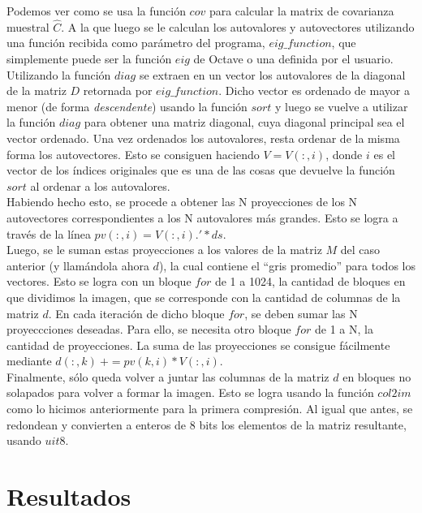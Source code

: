 \documentclass[twocolumn,a4paper,10pt]{article}
\begin{document}
Podemos ver como se usa la función $cov$ para calcular la matrix de covarianza muestral $\widehat{C}$. A la que luego se le calculan los autovalores y autovectores
utilizando una funci\'on recibida como par\'ametro del programa, $eig\_function$, que simplemente puede ser la funci\'on $eig$ de Octave o una definida por el usuario.
Utilizando la función $diag$ se extraen en un vector los autovalores de la diagonal de la matriz $D$ retornada por $eig\_function$. Dicho vector es ordenado de 
mayor a menor (de forma \textit{descendente}) usando la funci\'on $sort$ y luego se vuelve a utilizar la funci\'on $diag$ para obtener una matriz diagonal, cuya 
diagonal principal sea el vector ordenado. Una vez ordenados los autovalores, resta ordenar de la misma forma los autovectores. Esto se consiguen haciendo $V = V(:,i)$,
donde $i$ es el vector de los \'indices originales que es una de las cosas que devuelve la funci\'on $sort$ al ordenar a los autovalores.\\

Habiendo hecho esto, se procede a obtener las N proyecciones de los N autovectores correspondientes a los N autovalores más grandes. Esto se logra a través de la 
l\'inea $pv(:,i) = V(:,i).' * ds$. \\

Luego, se le suman estas proyecciones a los valores de la matriz $M$ del caso anterior (y llam\'andola ahora $d$), la cual contiene el ``gris promedio'' para todos 
los vectores. Esto se logra con un bloque $for$ de 1 a 1024, la cantidad de bloques en que dividimos la imagen, que se corresponde con la cantidad de columnas 
de la matriz $d$. En cada iteración de dicho bloque $for$, se deben sumar las N proyeccciones deseadas. Para ello, se necesita otro bloque $for$ de 1 a N, la cantidad 
de proyecciones. La suma de las proyecciones se consigue f\'acilmente mediante $d(:,k)\: += pv(k,i) * V(:,i)$. \\

Finalmente, s\'olo queda volver a juntar las columnas de la matriz $d$ en bloques no solapados para volver a formar la imagen. Esto se logra usando la funci\'on 
$col2im$ como lo hicimos anteriormente para la primera compresi\'on. Al igual que antes, se redondean y convierten a enteros de 8 bits los elementos de la matriz
resultante, usando $uit8$.\\


\section{Resultados}
\end{document}
